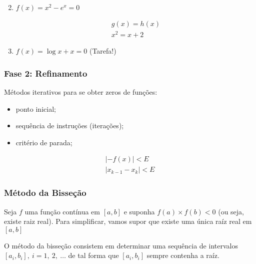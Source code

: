 \documentclass{article}
\begin{document}
\begin{enumerate}[label=\alph*]
\begin{multicols}{2}
        \end{multicols}
        \item $f(x) = x^2 - e^x = 0$

                \begin{gather*}
                    g(x) = h(x)\\
                    x^2 = x + 2
                \end{gather*}

            \item $f(x) = \log{x} + x = 0$ (Tarefa!)

        \end{enumerate}

        \subsubsection*{Fase 2: Refinamento}
        Métodos iterativos para se obter zeros de funções:
        \begin{itemize}
            \item ponto inicial;
            \item sequência de instruções (iterações);
            \item critério de parada;
        \end{itemize}

        \begin{gather*}
            |-f(x)| < E\\
            |x_{k-1} - x_k| < E
        \end{gather*}

        \subsubsection*{Método da Bisseção}
        Seja $f$ uma função contínua em $[a,b]$ e suponha $f(a) \times f(b) < 0$ (ou seja, existe raiz real).
        Para simplificar, vamos supor que existe uma única raíz real em $[a,b]$

        O método da bisseção consistem em determinar uma sequência de intervalos $[a_i,b_i],~i = 1,~2,~\ldots$ de tal forma que $[a_i,b_i]$ sempre contenha a raíz.

\end{document}
